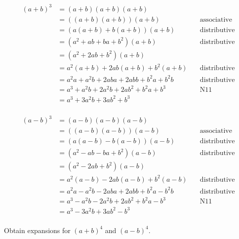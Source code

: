 \documentclass[6pt]{article}
\begin{document}
\begin{align*}
{(a + b)}^3 &= (a + b)(a + b)(a + b) & \\
&= ((a + b)(a + b))(a + b) & \quad \text{associative} \\
&= (a(a + b) + b(a + b))(a + b) & \quad \text{distributive} \\
&= (a^2 + ab + ba + b^2)(a + b) & \quad \text{distributive} \\
&= (a^2 + 2ab + b^2)(a + b) & \quad \text{} \\
&= a^2(a + b) + 2ab(a + b) + b^2(a + b) & \quad \text{distributive} \\
&= a^2 a + a^2 b + 2ab a + 2ab b + b^2 a + b^2 b & \quad \text{distributive} \\
&= a^3 + a^2 b + 2 a^2 b + 2ab^2 + b^2 a + b^3 & \quad \text{N11} \\
&= a^3 + 3 a^2 b + 3ab^2 + b^3 & \quad \text{} \\
\end{align*}

\begin{align*}
{(a - b)}^3 &= (a - b)(a - b)(a - b) & \\
&= ((a - b)(a - b))(a - b) & \quad \text{associative} \\
&= (a(a - b) - b(a - b))(a - b) & \quad \text{distributive} \\
&= (a^2 - ab - ba + b^2)(a - b) & \quad \text{distributive} \\
&= (a^2 - 2ab + b^2)(a - b) & \quad \text{} \\
&= a^2(a - b) - 2ab(a - b) + b^2(a - b) & \quad \text{distributive} \\
&= a^2 a - a^2 b - 2ab a + 2ab b + b^2 a - b^2 b & \quad \text{distributive} \\
&= a^3 - a^2 b - 2 a^2 b + 2ab^2 + b^2 a - b^3 & \quad \text{N11} \\
&= a^3 - 3 a^2 b + 3ab^2 - b^3 & \quad \text{} \\
\end{align*}


\begin{tcolorbox}[title=Problem 3, breakable]
Obtain expansions for ${(a+b)}^4$ and ${(a-b)}^4$.
\end{tcolorbox}

\end{document}
